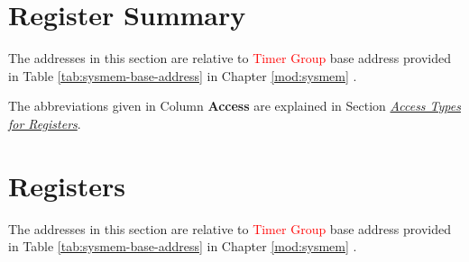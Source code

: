 \documentclass[main\_\_EN.tex]{subfiles}
\begin{document}



\clearpage
\hypertarget{timg-reg-summ}{}
\section{Register Summary}
\label{sec:timg-reg-summ}

The addresses in this section are relative to \textcolor{red}{Timer Group} base address provided in Table \ref{tab:sysmem-base-address} in Chapter \ref{mod:sysmem} \textit{}.

The abbreviations given in Column \textbf{Access} are explained in Section \hyperref[glossary-access-types]{\textit{Access Types for Registers}}.






\clearpage
\section{Registers}

The addresses in this section are relative to \textcolor{red}{Timer Group} base address provided in Table \ref{tab:sysmem-base-address} in Chapter \ref{mod:sysmem} \textit{}.


\end{document}
